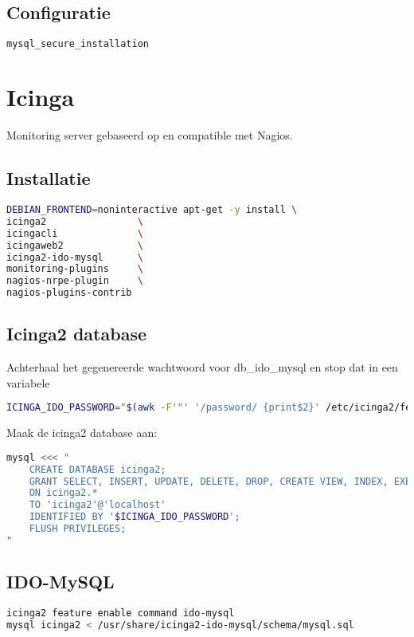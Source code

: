 \subsection{Configuratie}
\begin{lstlisting}[language=bash]
mysql_secure_installation
\end{lstlisting}

\section{Icinga}
Monitoring server gebaseerd op en compatible met Nagios.

\subsection{Installatie}
\begin{lstlisting}[language=bash]
DEBIAN_FRONTEND=noninteractive apt-get -y install \
icinga2                \
icingacli              \
icingaweb2             \
icinga2-ido-mysql      \
monitoring-plugins     \
nagios-nrpe-plugin     \
nagios-plugins-contrib
\end{lstlisting}

\subsection{Icinga2 database}
Achterhaal het gegenereerde wachtwoord voor db\_ido\_mysql en stop dat in een variabele
\begin{lstlisting}[language=bash]
ICINGA_IDO_PASSWORD="$(awk -F'"' '/password/ {print$2}' /etc/icinga2/features-available/ido-mysql.conf)"
\end{lstlisting}
Maak de icinga2 database aan:
\begin{lstlisting}[language=bash]
mysql <<< "
    CREATE DATABASE icinga2;
    GRANT SELECT, INSERT, UPDATE, DELETE, DROP, CREATE VIEW, INDEX, EXECUTE
    ON icinga2.*
    TO 'icinga2'@'localhost'
    IDENTIFIED BY '$ICINGA_IDO_PASSWORD';
    FLUSH PRIVILEGES;
"
\end{lstlisting}

\subsection{IDO-MySQL}
\begin{lstlisting}[language=bash]
icinga2 feature enable command ido-mysql
mysql icinga2 < /usr/share/icinga2-ido-mysql/schema/mysql.sql
\end{lstlisting}

